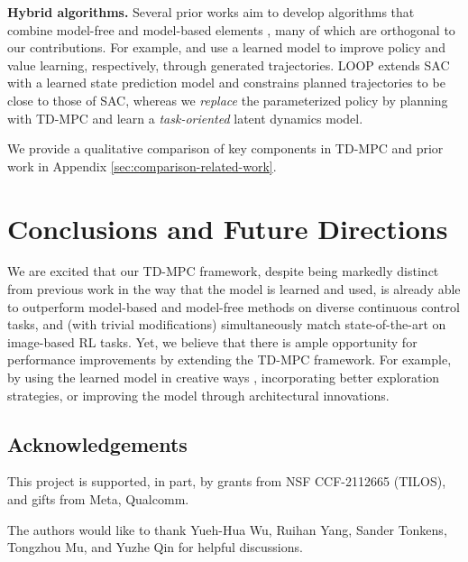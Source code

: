 \documentclass{article}
\begin{document}
\textbf{Hybrid algorithms.} Several prior works aim to develop algorithms that combine model-free and model-based elements \citep{Nagabandi2018NeuralND, Buckman2018SampleEfficientRL, Pong2018TemporalDM, Hafez2019CuriousMA, Sikchi2020LearningOW, Wang2020ExploringMP, Clavera2020ModelAugmentedAB, hansen2021deployment, Morgan2021ModelPA, Bhardwaj2021BlendingM, Margolis2021LearningTJ}, many of which are orthogonal to our contributions. For example, \citet{Clavera2020ModelAugmentedAB} and \citet{Buckman2018SampleEfficientRL, Lowrey2019PlanOL} use a learned model to improve policy and value learning, respectively, through generated trajectories. LOOP \citep{Sikchi2020LearningOW} extends SAC with a learned state prediction model and constrains planned trajectories to be close to those of SAC, whereas we \emph{replace} the parameterized policy by planning with TD-MPC and learn a \emph{task-oriented} latent dynamics model.

We provide a qualitative comparison of key components in TD-MPC and prior work in Appendix \ref{sec:comparison-related-work}.


\section{Conclusions and Future Directions}
\label{sec:conclusion}
We are excited that our TD-MPC framework, despite being markedly distinct from previous work in the way that the model is learned and used, is already able to outperform model-based and model-free methods on diverse continuous control tasks, and (with trivial modifications) simultaneously match state-of-the-art on image-based RL tasks. Yet, we believe that there is ample opportunity for performance improvements by extending the TD-MPC framework. For example, by using the learned model in creative ways \citep{Clavera2020ModelAugmentedAB, Buckman2018SampleEfficientRL, Lowrey2019PlanOL}, incorporating better exploration strategies, or improving the model through architectural innovations.

\subsection*{Acknowledgements}
\label{sec:acknowledgements}
\vspace{-0.025in}
This project is supported, in part, by grants from NSF CCF-2112665 (TILOS), and gifts from Meta, Qualcomm.

The authors would like to thank Yueh-Hua Wu, Ruihan Yang, Sander Tonkens, Tongzhou Mu, and Yuzhe Qin for helpful discussions.
\end{document}
